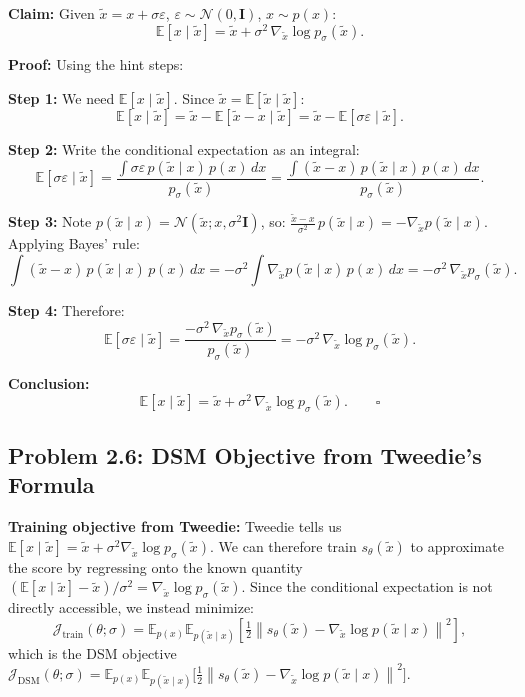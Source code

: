 \documentclass[11pt]{article}
\newcommand{\E}{\mathbb{E}}
\newcommand{\N}{\mathcal{N}}
\newcommand{\norm}[1]{\left\|#1\right\|}
\newcommand{\sth}{s_\theta}
\begin{document}
\textbf{Claim:} Given $\tilde x = x + \sigma\varepsilon$, $\varepsilon\sim\N(0,\mathbf{I})$,
$x\sim p(x)$:
\[
\E[x\mid\tilde x] = \tilde x + \sigma^2\,\nabla_{\tilde x}\log p_\sigma(\tilde x).
\]

\textbf{Proof:} Using the hint steps:

\textbf{Step 1:} We need $\E[x\mid\tilde x]$.  Since $\tilde x = \E[\tilde x\mid\tilde x]$:
\[
\E[x\mid\tilde x] = \tilde x - \E[\tilde x - x\mid\tilde x] = \tilde x - \E[\sigma\varepsilon\mid\tilde x].
\]

\textbf{Step 2:} Write the conditional expectation as an integral:
\[
\E[\sigma\varepsilon\mid\tilde x]
= \frac{\int \sigma\varepsilon\, p(\tilde x\mid x)\,p(x)\,dx}{p_\sigma(\tilde x)}
= \frac{\int (\tilde x - x)\, p(\tilde x\mid x)\,p(x)\,dx}{p_\sigma(\tilde x)}.
\]

\textbf{Step 3:} Note $p(\tilde x\mid x) = \N(\tilde x; x, \sigma^2\mathbf{I})$, so:
$\frac{\tilde x - x}{\sigma^2}\,p(\tilde x\mid x) = -\nabla_{\tilde x}p(\tilde x\mid x)$.
Applying Bayes' rule:
\[
\int (\tilde x-x)\,p(\tilde x\mid x)\,p(x)\,dx
= -\sigma^2 \int \nabla_{\tilde x}p(\tilde x\mid x)\,p(x)\,dx
= -\sigma^2\,\nabla_{\tilde x}p_\sigma(\tilde x).
\]

\textbf{Step 4:} Therefore:
\[
\E[\sigma\varepsilon\mid\tilde x] = \frac{-\sigma^2\,\nabla_{\tilde x}p_\sigma(\tilde x)}{p_\sigma(\tilde x)}
= -\sigma^2\,\nabla_{\tilde x}\log p_\sigma(\tilde x).
\]

\textbf{Conclusion:}
\[
\E[x\mid\tilde x] = \tilde x + \sigma^2\,\nabla_{\tilde x}\log p_\sigma(\tilde x). \qquad\square
\]

\subsection{Problem 2.6: DSM Objective from Tweedie's Formula}

\textbf{Training objective from Tweedie:} Tweedie tells us $\E[x\mid\tilde x] = \tilde x + \sigma^2\nabla_{\tilde x}\log p_\sigma(\tilde x)$.  We can therefore train $\sth(\tilde x)$ to approximate the score by regressing onto the known quantity $(\E[x\mid\tilde x]-\tilde x)/\sigma^2 = \nabla_{\tilde x}\log p_\sigma(\tilde x)$.  Since the conditional expectation is not directly accessible, we instead minimize:
\[
\mathcal{J}_\mathrm{train}(\theta;\sigma)
= \E_{p(x)}\E_{p(\tilde x\mid x)}\!\left[\tfrac{1}{2}\norm{\sth(\tilde x) - \nabla_{\tilde x}\log p(\tilde x\mid x)}^2\right],
\]
which is the DSM objective
$\mathcal{J}_\mathrm{DSM}(\theta;\sigma)
= \E_{p(x)}\E_{p(\tilde x\mid x)}\!\bigl[\tfrac{1}{2}\norm{\sth(\tilde x)-\nabla_{\tilde x}\log p(\tilde x\mid x)}^2\bigr]$.
\end{document}
